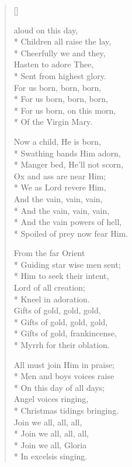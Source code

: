 \newHymn
{}

\pointorig
\begin{multicols}{2}
\begin{verse}[\versewidth]

 aloud on this day,\\*
Children all raise the lay,\\*
Cheerfully we and they,\\
Hasten to adore Thee,\\*
Sent from highest glory.\\
For us born, born, born,\\*
For us born, born, born,\\*
For us born, on this morn,\\*
Of the Virgin Mary.


Now a child, He is born,\\*
Swathing bands Him adorn,\\*
Manger bed, He'll not scorn,\\
Ox and ass are near Him;\\*
We as Lord revere Him,\\
And the vain, vain, vain,\\*
And the vain, vain, vain,\\*
And the vain powers of hell,\\*
Spoiled of prey now fear Him.

From the far Orient\\*
Guiding star wise men sent;\\*
Him to seek their intent,\\
Lord of all creation;\\*
Kneel in adoration.\\
Gifts of gold, gold, gold,\\*
Gifts of gold, gold, gold,\\*
Gifts of gold, frankincense,\\*
Myrrh for their oblation.

All must join Him in praise;\\*
Men and boys voices raise\\*
On this day of all days;\\
Angel voices ringing,\\*
Christmas tidings bringing.\\
Join we all, all, all,\\*
Join we all, all, all,\\*
Join we all, Gloria\\*
In excelsis singing.

\end{verse}
\end{multicols}

